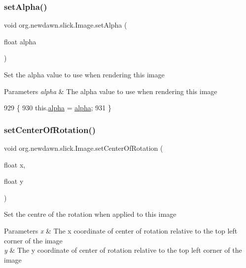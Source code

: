 \subsubsection{\texorpdfstring{set\+Alpha()}{setAlpha()}}
{\footnotesize\ttfamily void org.\+newdawn.\+slick.\+Image.\+set\+Alpha (\begin{DoxyParamCaption}\item[{float}]{alpha }\end{DoxyParamCaption})\hspace{0.3cm}{\ttfamily [inline]}}

Set the alpha value to use when rendering this image


\begin{DoxyParams}{Parameters}
{\em alpha} & The alpha value to use when rendering this image \\
\hline
\end{DoxyParams}

\begin{DoxyCode}
929                                       \{
930         this.\mbox{\hyperlink{classorg_1_1newdawn_1_1slick_1_1_image_a10f6c66f0f6ed78b3c1c05ac4f076dda}{alpha}} = \mbox{\hyperlink{classorg_1_1newdawn_1_1slick_1_1_image_a10f6c66f0f6ed78b3c1c05ac4f076dda}{alpha}};
931     \}
\end{DoxyCode}
\mbox{\label{classorg_1_1newdawn_1_1slick_1_1_image_a0619bfcf29c4442f3db4facc917e8677}} 
\subsubsection{\texorpdfstring{set\+Center\+Of\+Rotation()}{setCenterOfRotation()}}
{\footnotesize\ttfamily void org.\+newdawn.\+slick.\+Image.\+set\+Center\+Of\+Rotation (\begin{DoxyParamCaption}\item[{float}]{x,  }\item[{float}]{y }\end{DoxyParamCaption})\hspace{0.3cm}{\ttfamily [inline]}}

Set the centre of the rotation when applied to this image


\begin{DoxyParams}{Parameters}
{\em x} & The x coordinate of center of rotation relative to the top left corner of the image \\
\hline
{\em y} & The y coordinate of center of rotation relative to the top left corner of the image \\
\hline
\end{DoxyParams}

